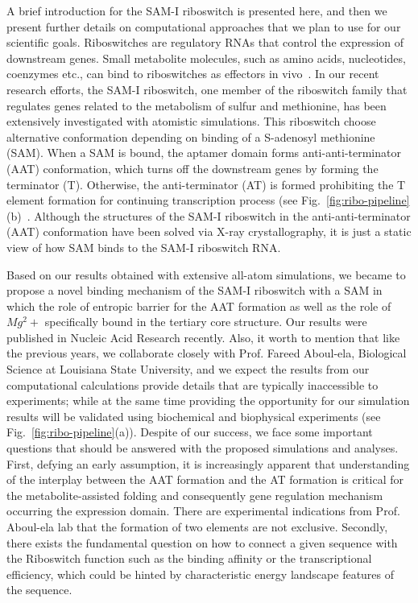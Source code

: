 \documentclass[a4paper,10pt]{article}
\begin{document}
A brief introduction for the SAM-I riboswitch is presented here, and then we present further details on computational approaches that we plan to use for our scientific goals.  Riboswitches are regulatory RNAs that control the expression of downstream genes. Small metabolite molecules, such as amino acids, nucleotides, coenzymes etc., can bind to riboswitches as effectors in vivo~\cite{mandal}.  In our recent research efforts, the SAM-I riboswitch, one member of the riboswitch family that regulates genes related to the metabolism of sulfur and methionine, has been extensively investigated with atomistic simulations.  This riboswitch choose alternative conformation depending on binding of a S-adenosyl methionine (SAM).  When a SAM is bound, the aptamer domain forms anti-anti-terminator (AAT) conformation, which turns off the downstream genes by forming the terminator (T). Otherwise, the anti-terminator (AT) is formed prohibiting the T element formation for continuing transcription process (see Fig.~\ref{fig:ribo-pipeline}(b)~\cite{brooke}.  Although the structures of the SAM-I riboswitch in the anti-anti-terminator (AAT) conformation have been solved via X-ray crystallography, it is just a static view of how SAM binds to the SAM-I riboswitch RNA.  

Based on our results obtained with extensive all-atom simulations, we became to propose a novel binding mechanism of the SAM-I riboswitch with a SAM in which the role of entropic barrier for the AAT formation as well as the role of $Mg^2+$ specifically bound in the tertiary core structure.  Our results were published in Nucleic Acid Research recently\cite{SAM-I-NAR2009}.  Also, it worth to mention that like the previous years, we collaborate closely with Prof. Fareed Aboul-ela, Biological Science at Louisiana State University, and we expect the results from our computational calculations provide details that are typically inaccessible to experiments; while at the same time providing the opportunity for our simulation results will be validated using biochemical and biophysical experiments (see Fig.~\ref{fig:ribo-pipeline}(a)).   Despite of our success, we face some important questions that should be answered with the proposed simulations and analyses.  First, defying an early assumption, it is increasingly apparent that understanding of the interplay between the AAT formation and the AT formation is critical for the metabolite-assisted folding and consequently gene regulation mechanism occurring the expression domain.  There are experimental indications from Prof. Aboul-ela lab that the formation of two elements are not exclusive.  Secondly, there exists the fundamental question on how to connect a given sequence with the Riboswitch function such as the binding affinity or the transcriptional efficiency, which could be hinted by characteristic energy landscape features of the sequence. 
\end{document}
